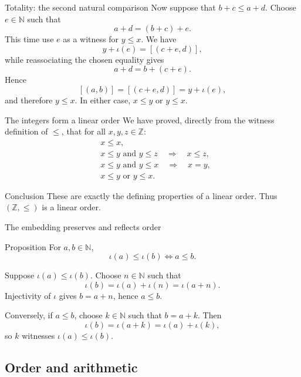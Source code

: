 \documentclass[aspectratio=169,11pt]{beamer}
\newcommand{\N}{\mathbb N}
\newcommand{\Z}{\mathbb Z}
\newcommand{\cl}[2]{\left[(#1,#2)\right]}
\begin{document}
\begin{frame}{Totality: the second natural comparison}
  \small
  Now suppose that \(b+c\le a+d\).  Choose \(e\in\N\) such that
  \[
    a+d=(b+c)+e.
  \]
  This time use \(e\) as a witness for \(y\le x\).  We have
  \[
    y+\iota(e)=\cl{c+e}{d},
  \]
  while reassociating the chosen equality gives
  \[
    a+d=b+(c+e).
  \]
  Hence
  \[
    \cl{a}{b}=\cl{c+e}{d}=y+\iota(e),
  \]
  and therefore \(y\le x\).  In either case, \(x\le y\) or \(y\le x\).
\end{frame}

\begin{frame}{The integers form a linear order}
  We have proved, directly from the witness definition of \(\le\), that
  for all \(x,y,z\in\Z\):
  \begin{align*}
    &x\le x,\\
    &x\le y\text{ and }y\le z \quad\Longrightarrow\quad x\le z,\\
    &x\le y\text{ and }y\le x \quad\Longrightarrow\quad x=y,\\
    &x\le y\text{ or }y\le x.
  \end{align*}

  \begin{block}{Conclusion}
    These are exactly the defining properties of a linear order.  Thus
    \((\Z,\le)\) is a linear order.
  \end{block}
\end{frame}

\begin{frame}{The embedding preserves and reflects order}
  \small
  \begin{block}{Proposition}
    For \(a,b\in\N\),
    \[
      \boxed{\iota(a)\le\iota(b)\Longleftrightarrow a\le b.}
    \]
  \end{block}

  Suppose \(\iota(a)\le\iota(b)\).  Choose \(n\in\N\) such that
  \[
    \iota(b)=\iota(a)+\iota(n)=\iota(a+n).
  \]
  Injectivity of \(\iota\) gives \(b=a+n\), hence \(a\le b\).

  Conversely, if \(a\le b\), choose \(k\in\N\) such that \(b=a+k\).  Then
  \[
    \iota(b)=\iota(a+k)=\iota(a)+\iota(k),
  \]
  so \(k\) witnesses \(\iota(a)\le\iota(b)\).
\end{frame}

\subsection{Order and arithmetic}
\end{document}
